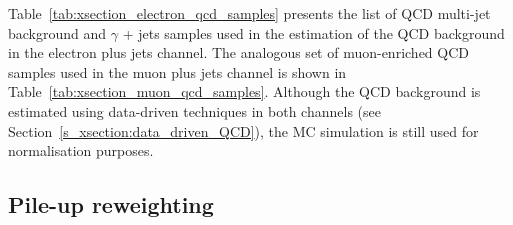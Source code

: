 Table~\ref{tab:xsection_electron_qcd_samples} presents the list of QCD multi-jet background and $\gamma$ + jets samples
used in the estimation of the QCD background in the electron plus jets channel. The analogous set of muon-enriched QCD
samples used in the muon plus jets channel is shown in Table~\ref{tab:xsection_muon_qcd_samples}. Although the QCD
background is estimated using data-driven techniques in both channels (see Section~\ref{s_xsection:data_driven_QCD}),
the MC simulation is still used for normalisation purposes.



\subsection{Pile-up reweighting}
\label{sss_xsection:pileup_reweighting}

